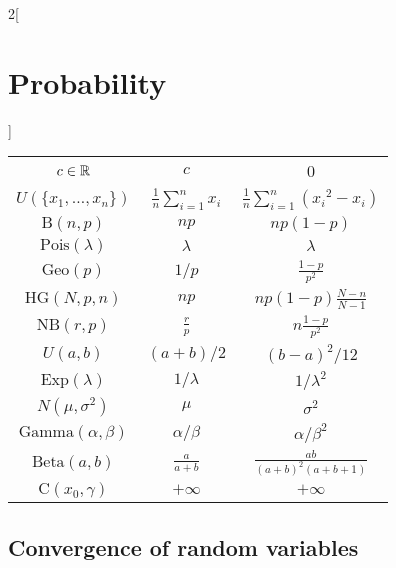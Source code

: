 \documentclass[../../../main.tex]{subfiles}
\begin{document}
\begin{multicols}{2}[\section{Probability}]
\begin{center}
\begin{tabular}{|c|c|c|}
      \hline
      $c\in\mathbb{R}$                    & $\displaystyle c$             & 0                                           \\
      $U(\{x_1,\ldots,x_n\})$      & $\frac{1}{n}\sum_{i=1}^n x_i$ & $\frac{1}{n}\sum_{i=1}^n ({x_i}^2-x_i)$     \\
      $\text{B}(n,p)$              & $\displaystyle np$            & $\displaystyle np(1-p)$                     \\
      $\text{Pois}(\lambda)$       & $\displaystyle \lambda$       & $\displaystyle \lambda$                     \\
      $\text{Geo}(p)$              & $\displaystyle 1/p$           & $\displaystyle \frac{1-p}{p^2}$             \\
      $\text{HG}(N,p,n)$           & $\displaystyle np$            & $\displaystyle np(1-p)\frac{N-n}{N-1}$      \\
      $\text{NB}(r,p)$             & $\displaystyle \frac{r}{p}$   & $\displaystyle n\frac{1-p}{p^2}$            \\
      $U(a,b)$                     & $\displaystyle (a+b)/2$       & $\displaystyle {(b-a)}^2/12$                \\
      $\text{Exp}(\lambda)$        & $\displaystyle 1/\lambda$     & $\displaystyle 1/\lambda^2$                 \\
      $N(\mu,\sigma^2)$            & $\displaystyle \mu$           & $\displaystyle \sigma^2$                    \\
      $\text{Gamma}(\alpha,\beta)$ & $\displaystyle \alpha/\beta$  & $\displaystyle \alpha/\beta^2$              \\
      $\text{Beta}(a,b)$           & $\displaystyle \frac{a}{a+b}$ & $\displaystyle \frac{ab}{{(a+b)}^2(a+b+1)}$ \\
      $\text{C}(x_0,\gamma)$       & $\displaystyle +\infty$       & $\displaystyle +\infty$                     \\
      \hline
    \end{tabular}
  \end{center}
  \subsection{Convergence of random variables}

\end{multicols}
\end{document}
